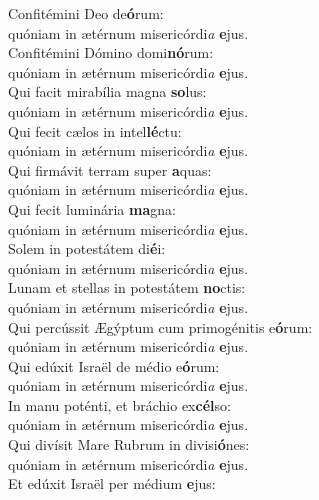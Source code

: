 \evenverse Confitémini Deo de\textbf{ó}rum:~\*\\
\evenverse quóniam in ætérnum misericórdi\textit{a} \textbf{e}jus.\\
\oddverse Confitémini Dómino domi\textbf{nó}rum:~\*\\
\oddverse quóniam in ætérnum misericórdi\textit{a} \textbf{e}jus.\\
\evenverse Qui facit mirabília magna \textbf{so}lus:~\*\\
\evenverse quóniam in ætérnum misericórdi\textit{a} \textbf{e}jus.\\
\oddverse Qui fecit cælos in intel\textbf{lé}ctu:~\*\\
\oddverse quóniam in ætérnum misericórdi\textit{a} \textbf{e}jus.\\
\evenverse Qui firmávit terram super \textbf{a}quas:~\*\\
\evenverse quóniam in ætérnum misericórdi\textit{a} \textbf{e}jus.\\
\oddverse Qui fecit luminária \textbf{ma}gna:~\*\\
\oddverse quóniam in ætérnum misericórdi\textit{a} \textbf{e}jus.\\
\evenverse Solem in potestátem di\textbf{é}i:~\*\\
\evenverse quóniam in ætérnum misericórdi\textit{a} \textbf{e}jus.\\
\oddverse Lunam et stellas in potestátem \textbf{no}ctis:~\*\\
\oddverse quóniam in ætérnum misericórdi\textit{a} \textbf{e}jus.\\
\evenverse Qui percússit Ægýptum cum primogénitis e\textbf{ó}rum:~\*\\
\evenverse quóniam in ætérnum misericórdi\textit{a} \textbf{e}jus.\\
\oddverse Qui edúxit Israël de médio e\textbf{ó}rum:~\*\\
\oddverse quóniam in ætérnum misericórdi\textit{a} \textbf{e}jus.\\
\evenverse In manu poténti, et bráchio ex\textbf{cél}so:~\*\\
\evenverse quóniam in ætérnum misericórdi\textit{a} \textbf{e}jus.\\
\oddverse Qui divísit Mare Rubrum in divisi\textbf{ó}nes:~\*\\
\oddverse quóniam in ætérnum misericórdi\textit{a} \textbf{e}jus.\\
\evenverse Et edúxit Israël per médium \textbf{e}jus:~\*\\
